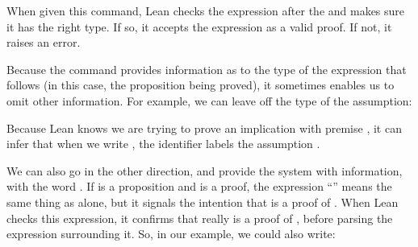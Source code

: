 \documentclass[letterpaper,10pt,english]{sphinxmanual}
\begin{document}
\begin{sphinxVerbatim}[commandchars=\\\{\}]
           
       
    
\end{sphinxVerbatim}

\sphinxAtStartPar
When given this command,
Lean checks the expression after the \sphinxcode{\sphinxupquote{:=}} and makes sure it has the right type.
If so,
it accepts the expression as a valid proof. If not, it raises an error.

\sphinxAtStartPar
Because the  command provides information as to the
type of the expression that follows
(in this case, the proposition being proved),
it sometimes enables us to omit other information.
For example, we can leave off the type of the assumption:

\begin{sphinxVerbatim}[commandchars=\\\{\}]
           
  
    
\end{sphinxVerbatim}

\sphinxAtStartPar
Because Lean knows we are trying to prove an implication with premise
,
it can infer that when we write , the identifier  labels the assumption .

\sphinxAtStartPar
We can also go in the other direction,
and provide the system with  information, with the word .
If  is a proposition and  is a proof,
the expression “” means the same thing as  alone,
but it signals the intention that  is a proof of .
When Lean checks this expression,
it confirms that  really is a proof of ,
before parsing the expression surrounding it.
So, in our example,
we could also write:
\end{document}
